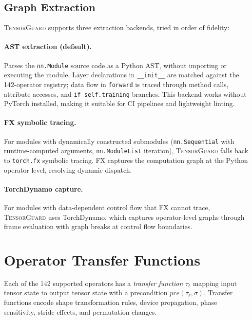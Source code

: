 \documentclass[10pt]{article}
\newcommand{\tguard}{\textsc{TensorGuard}}
\theoremstyle{plain}
\theoremstyle{definition}
\theoremstyle{remark}
\begin{document}
\subsection{Graph Extraction}\label{sec:extraction}

\tguard{} supports three extraction backends, tried in order of
fidelity:

\paragraph{AST extraction (default).}
Parses the \texttt{nn.Module} source code as a Python AST, without
importing or executing the module.  Layer declarations in
\texttt{\_\_init\_\_} are matched against the 142-operator registry;
data flow in \texttt{forward} is traced through method calls,
attribute accesses, and \texttt{if self.training} branches.  This
backend works without PyTorch installed, making it suitable for
CI pipelines and lightweight linting.

\paragraph{FX symbolic tracing.}
For modules with dynamically constructed submodules
(\texttt{nn.Sequential} with runtime-computed arguments,
\texttt{nn.ModuleList} iteration), \tguard{} falls back to
\texttt{torch.fx} symbolic tracing.  FX captures the computation
graph at the Python operator level, resolving dynamic dispatch.

\paragraph{TorchDynamo capture.}
For modules with data-dependent control flow that FX cannot trace,
\tguard{} uses TorchDynamo, which captures operator-level graphs
through frame evaluation with graph breaks at control flow
boundaries.


\section{Operator Transfer Functions}\label{sec:transfer}

Each of the 142 supported operators has a \emph{transfer function}
$\tau_\ell$ mapping input tensor state to output tensor state with a
precondition $\mathit{pre}(\tau_\ell, \sigma)$.  Transfer functions
encode shape transformation rules, device propagation, phase
sensitivity, stride effects, and permutation changes.
\end{document}
